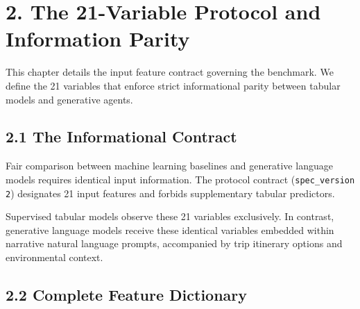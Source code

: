 \section{2. The 21-Variable Protocol and Information Parity}

This chapter details the input feature contract governing the benchmark. We define the 21 variables that enforce strict informational parity between tabular models and generative agents.

\subsection{2.1 The Informational Contract}

Fair comparison between machine learning baselines and generative language models requires identical input information. The protocol contract (\texttt{spec_version 2}) designates 21 input features and forbids supplementary tabular predictors.

Supervised tabular models observe these 21 variables exclusively. In contrast, generative language models receive these identical variables embedded within narrative natural language prompts, accompanied by trip itinerary options and environmental context.

\subsection{2.2 Complete Feature Dictionary}

